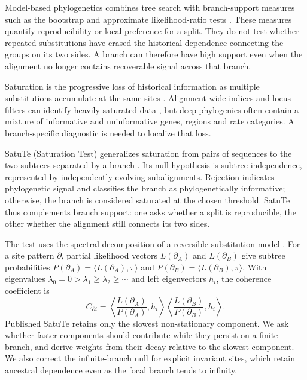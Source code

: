 Model-based phylogenetics combines tree search with branch-support measures such as the bootstrap and approximate likelihood-ratio tests \cite{felsenstein1985confidence,hoang2017,anisimova2006,minh2020iqtree}. These measures quantify reproducibility or local preference for a split. They do not test whether repeated substitutions have erased the historical dependence connecting the groups on its two sides. A branch can therefore have high support even when the alignment no longer contains recoverable signal across that branch.

Saturation is the progressive loss of historical information as multiple substitutions accumulate at the same sites \cite{philippe2011,ho2004}. Alignment-wide indices and locus filters can identify heavily saturated data \cite{xia2003index,duchene2021}, but deep phylogenies often contain a mixture of informative and uninformative genes, regions and rate categories. A branch-specific diagnostic is needed to localize that loss.

SatuTe (Saturation Test) generalizes saturation from pairs of sequences to the two subtrees separated by a branch \cite{manuel2025satute}. Its null hypothesis is subtree independence, represented by independently evolving subalignments. Rejection indicates phylogenetic signal and classifies the branch as phylogenetically informative; otherwise, the branch is considered saturated at the chosen threshold. SatuTe thus complements branch support: one asks whether a split is reproducible, the other whether the alignment still connects its two sides.

The test uses the spectral decomposition of a reversible substitution model \cite{levin2017,tavare1986}. For a site pattern \(\partial\), partial likelihood vectors \(L(\partial_A)\) and \(L(\partial_B)\) give subtree probabilities \(P(\partial_A)=\langle L(\partial_A),\pi\rangle\) and \(P(\partial_B)=\langle L(\partial_B),\pi\rangle\). With eigenvalues \(\lambda_0=0>\lambda_1\geq\lambda_2\geq\cdots\) and left eigenvectors \(h_i\), the coherence coefficient is
\begin{equation}
C_{\partial i}
=
\left\langle \frac{L(\partial_A)}{P(\partial_A)},h_i\right\rangle
\left\langle \frac{L(\partial_B)}{P(\partial_B)},h_i\right\rangle .
\label{eq-coherence}
\end{equation}
Published SatuTe retains only the slowest non-stationary component. We ask whether faster components should contribute while they persist on a finite branch, and derive weights from their decay relative to the slowest component. We also correct the infinite-branch null for explicit invariant sites, which retain ancestral dependence even as the focal branch tends to infinity.

